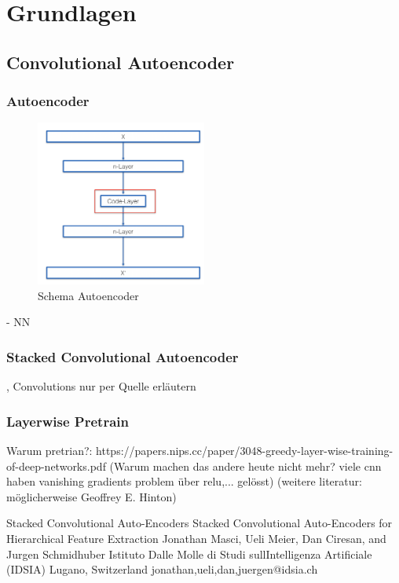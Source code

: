 \chapter{Grundlagen}
\label{chap:Grundlagen}

	\section{ Convolutional Autoencoder}
	\label{sec:StackedConvolutionalAutoencoder}
		\subsection{Autoencoder }			
			\begin{figure}[h]
				\centering
				\includegraphics[width=0.5\textwidth, center]{bilder/Schema_Autoencoders/Schema_CAE.png}
				\caption[Schema Autoencoder]{Schema Autoencoder}
				\label{img:SchemaCAE}
			\end{figure}  
		
			- NN
		\subsection{Stacked Convolutional Autoencoder }
			, Convolutions nur per Quelle erläutern
		\subsection{Layerwise Pretrain }

		Warum pretrian?:	https://papers.nips.cc/paper/3048-greedy-layer-wise-training-of-deep-networks.pdf (Warum machen das andere heute nicht mehr? viele cnn haben vanishing gradients problem  über relu,... gelösst) (weitere literatur: möglicherweise Geoffrey E. Hinton)

		Stacked Convolutional Auto-Encoders Stacked Convolutional Auto-Encoders for
		Hierarchical Feature Extraction
		Jonathan Masci, Ueli Meier, Dan Ciresan, and Jurgen Schmidhuber
		Istituto Dalle Molle di Studi sullIntelligenza Artificiale (IDSIA)
		Lugano, Switzerland
		{jonathan,ueli,dan,juergen}@idsia.ch
		
